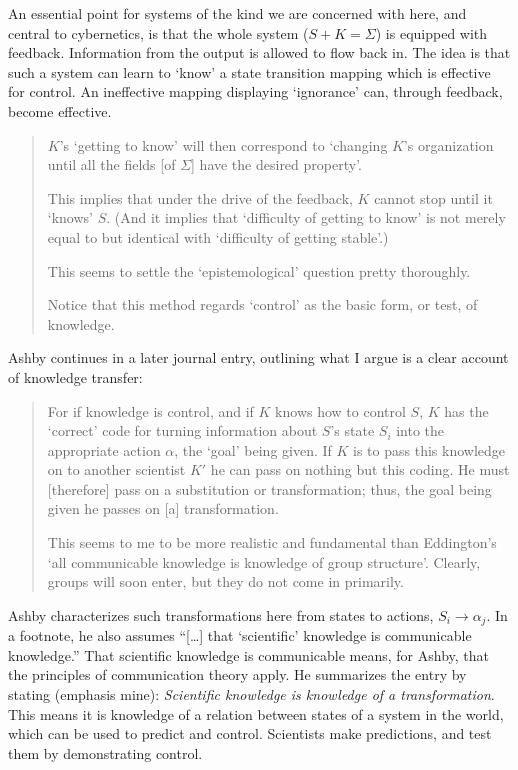 \documentclass[11pt, oneside]{article}   	%
\begin{document}
An essential point for systems of the kind we are concerned with here, and central to cybernetics, is that the whole system ($S + K = \Sigma$) is equipped with feedback.  Information from the output is allowed to flow back in.  The idea is that such a system can learn to `know' a state transition mapping which is effective for control.  An ineffective mapping displaying `ignorance' can, through feedback, become effective.

\begin{quote}
$K$'s `getting to know' will then correspond to `changing $K$'s organization until all the fields [of $\Sigma$] have the desired property'.

This implies that under the drive of the feedback, $K$ cannot stop until it `knows' $S$.  (And it implies that `difficulty of getting to know' is not merely equal to but identical with `difficulty of getting stable'.)

This seems to settle the `epistemological' question pretty thoroughly.

Notice that this method regards `control' as the basic form, or test, of knowledge.  \cite[p. 4293]{AshbyJournal}
\end{quote}

Ashby continues in a later journal entry, outlining what I argue is a clear account of knowledge transfer:

\begin{quote}
For if knowledge is control, and if $K$ knows how to control $S$, $K$ has the `correct' code for turning information about $S$'s state $S_i$ into the appropriate action $\alpha$, the `goal' being given.  If $K$ is to pass this knowledge on to another scientist $K'$ he can pass on nothing but this coding.  He must [therefore] pass on a substitution or transformation; thus, the goal being given he passes on [a] transformation. 

This seems to me to be more realistic and fundamental than Eddington's `all communicable knowledge is knowledge of group structure'.  Clearly, groups will soon enter, but they do not come in primarily.  \cite[p. 4311]{AshbyJournal}
\end{quote}

Ashby characterizes such transformations here from states to actions, $S_i \rightarrow \alpha_j$.  In a footnote, he also assumes ``[\dots] that `scientific' knowledge is communicable knowledge.''  That scientific knowledge is communicable means, for Ashby, that the principles of communication theory apply.  He summarizes the entry by stating (emphasis mine):  \emph{Scientific knowledge is knowledge of a transformation}.  This means it is knowledge of a relation between states of a system in the world, which can be used to predict and control.  Scientists make predictions, and test them by demonstrating control.
\end{document}
